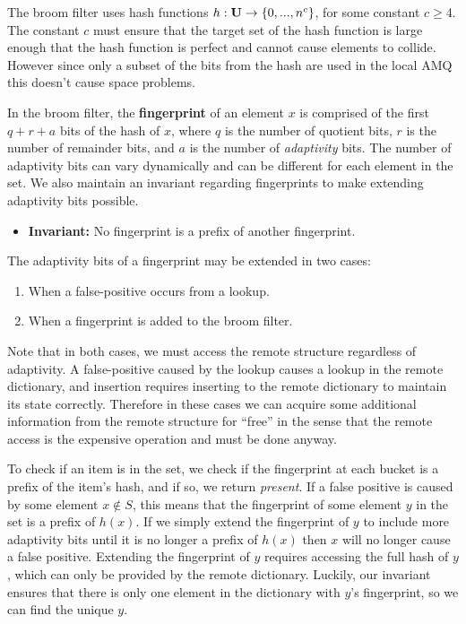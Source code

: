 \documentclass[../paper.tex]{subfiles}
\begin{document}
The broom filter uses hash functions $h : {\bf U} \rightarrow \{0, ..., n^c\}$, for
some constant $c \geq 4$. The constant $c$ must ensure that the target set of the hash
function is large enough that the hash function is perfect and cannot cause elements
to collide. However since only a subset of the bits from the hash are used in the local
AMQ this doesn't cause space problems.


In the broom filter, the \textbf{fingerprint} of an element $x$ is comprised of the first
$q + r + a$ bits of the hash of $x$, where $q$ is the number of quotient bits, $r$ is the
number of remainder bits, and $a$ is the number of \textit{adaptivity} bits. The number of
adaptivity bits can vary dynamically and can be different for each element in the set. We
also maintain an invariant regarding fingerprints to make extending adaptivity bits possible.

\begin{itemize}
    \item[] \textbf{Invariant:} No fingerprint is a prefix of another fingerprint.
\end{itemize}

The adaptivity bits of a fingerprint may be extended in two cases:

\begin{enumerate}
    \item When a false-positive occurs from a lookup.
    \item When a fingerprint is added to the broom filter.
\end{enumerate}

Note that in both cases, we must access the remote structure regardless of adaptivity. A false-positive
caused by the lookup causes a lookup in the remote dictionary, and insertion requires inserting
to the remote dictionary to maintain its state correctly. Therefore in these cases we can
acquire some additional information from the remote structure for ``free'' in the sense that
the remote access is the expensive operation and must be done anyway.

To check if an item is in the set, we check if the fingerprint at each bucket is a prefix
of the item's hash, and if so, we return \textit{present}. 
If a false positive is caused by some element $x \notin S$, this means that
the fingerprint of some element $y$ in the set is a prefix of $h(x)$. If we
simply extend the fingerprint of $y$ to include more adaptivity bits until
it is no longer a prefix of $h(x)$ then $x$ will no longer cause a false positive. Extending
the fingerprint of $y$ requires accessing the full hash of $y$, which can only be
provided by the remote dictionary. Luckily, our invariant ensures that there is
only one element in the dictionary with $y$'s fingerprint, so we can find the unique
$y$.
\end{document}
